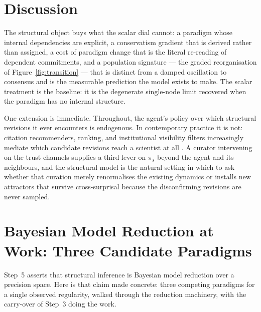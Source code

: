 \section{Discussion}
\label{sec:discussion}

The structural object buys what the scalar dial cannot: a paradigm whose
internal dependencies are explicit, a conservatism gradient that is
derived rather than assigned, a cost of paradigm change that is the
literal re-reading of dependent commitments, and a population signature
--- the graded reorganisation of Figure~\ref{fig:transition} --- that is
distinct from a damped oscillation to consensus and is the measurable
prediction the model exists to make. The scalar treatment is the
baseline: it is the degenerate single-node limit recovered when the
paradigm has no internal structure.

One extension is immediate. Throughout, the agent's policy over which
structural revisions it ever encounters is endogenous. In contemporary
practice it is not: citation recommenders, ranking, and institutional
visibility filters increasingly mediate which candidate revisions reach
a scientist at all \citep{kulveit2025GradualDisempowerment, critchKrueger2020ARCHES}. A curator intervening on the trust channels
supplies a third lever on $\pi_s$ beyond the agent and its neighbours,
and the structural model is the natural setting in which to ask whether
that curation merely renormalises the existing dynamics or installs new
attractors that survive cross-surprisal because the disconfirming
revisions are never sampled.

\appendix
\section{Bayesian Model Reduction at Work: Three Candidate Paradigms}
\label{app:abc}

Step~5 asserts that structural inference is Bayesian model reduction over
a precision space. Here is that claim made concrete: three competing
paradigms for a single observed regularity, walked through the reduction
machinery, with the carry-over of Step~3 doing the work.

